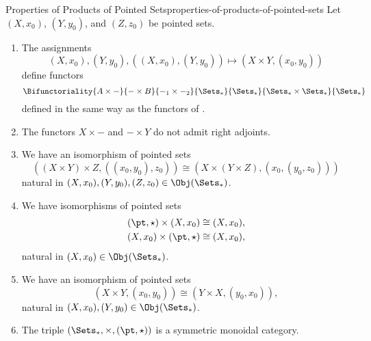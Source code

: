 \begin{proposition}{Properties of Products of Pointed Sets}{properties-of-products-of-pointed-sets}%
    Let $(X,x_{0})$, $(Y,y_{0})$, and $(Z,z_{0})$ be pointed sets.
    \begin{enumerate}
        \item\label{properties-of-products-of-pointed-sets-functoriality}The assignments
            \[
                (X,x_{0}),(Y,y_{0}),((X,x_{0}),(Y,y_{0}))\mapsto(X\times Y,(x_{0},y_{0}))%
            \]%
            define functors
            \[
                \Bifunctoriality{A\times-}{-\times B}{-_{1}\times-_{2}}{\Sets_{*}}{\Sets_{*}}{\Sets_{*}\times\Sets_{*}}{\Sets_{*}}%
            \]%
            defined in the same way as the functors of .
        \item\label{properties-of-products-of-pointed-sets-lack-of-adjointness}The functors $X\times-$ and $-\times Y$ do not admit right adjoints.
        \item\label{properties-of-products-of-pointed-sets-associativity}We have an isomorphism of pointed sets%
            \[
                ((X\times Y)\times Z,((x_{0},y_{0}),z_{0}))
                \cong
                (X\times(Y\times Z),(x_{0},(y_{0},z_{0})))
            \]%
            natural in $(X,x_{0}),(Y,y_{0}),(Z,z_{0})\in\Obj(\Sets_{*})$.
        \item\label{properties-of-products-of-pointed-sets-unitality}We have isomorphisms of pointed sets
            \begin{align*}
                (\pt,\star)\times(X,x_{0}) &\cong (X,x_{0}),\\
                (X,x_{0})\times(\pt,\star) &\cong (X,x_{0}),
            \end{align*}
            natural in $(X,x_{0})\in\Obj(\Sets_{*})$.
        \item\label{properties-of-products-of-pointed-sets-commutativity}We have an isomorphism of pointed sets
            \[
                (X\times Y,(x_{0},y_{0}))
                \cong
                (Y\times X,(y_{0},x_{0})),
            \]%
            natural in $(X,x_{0}),(Y,y_{0})\in\Obj(\Sets_{*})$.
        \item\label{properties-of-products-of-pointed-sets-symmetric-monoidality}The triple $(\Sets_{*},\times,(\pt,\star))$ is a symmetric monoidal category.
    \end{enumerate}
\end{proposition}
